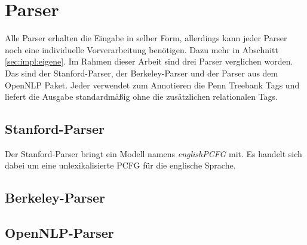 \section{Parser}

Alle Parser erhalten die Eingabe in selber Form, allerdings kann jeder Parser noch eine individuelle Vorverarbeitung benötigen. Dazu mehr in Abschnitt \ref{sec:impl:eigene}.
Im Rahmen dieser Arbeit sind drei Parser verglichen worden. Das sind der Stanford-Parser, der Berkeley-Parser und der Parser aus dem OpenNLP Paket. Jeder verwendet zum Annotieren die Penn Treebank Tags und liefert die Ausgabe standardmäßig ohne die zusätzlichen relationalen Tags. 



\subsection{Stanford-Parser}
Der Stanford-Parser bringt ein Modell namens \textit{englishPCFG} mit. Es handelt sich dabei um eine unlexikalisierte PCFG für die englische Sprache. 
\subsection{Berkeley-Parser}

\subsection{OpenNLP-Parser}


